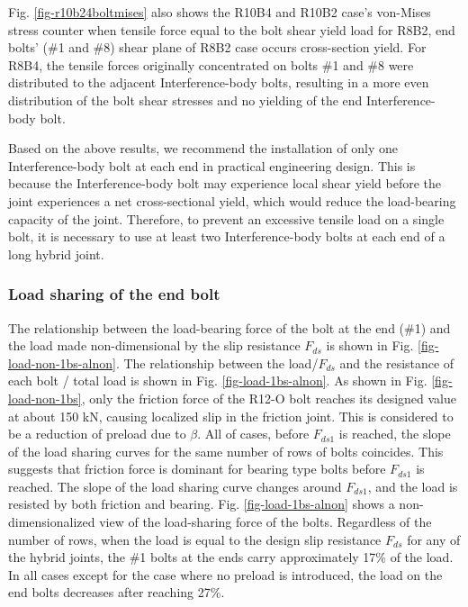 Fig. \ref{fig-r10b24boltmises} also shows the R10B4 and R10B2 case's von-Mises stress counter when tensile force equal to the bolt shear yield load for R8B2, end bolts' (\#1 and \#8) shear plane of R8B2 case occurs cross-section yield. For R8B4, the tensile forces originally concentrated on bolts \#1 and \#8 were distributed to the adjacent Interference-body bolts, resulting in a more even distribution of the bolt shear stresses and no yielding of the end Interference-body bolt.

Based on the above results, we recommend the installation of only one Interference-body bolt at each end in practical engineering design. This is because the Interference-body bolt may experience local shear yield before the joint experiences a net cross-sectional yield, which would reduce the load-bearing capacity of the joint. Therefore, to prevent an excessive tensile load on a single bolt, it is necessary to use at least two Interference-body bolts at each end of a long hybrid joint.


\subsubsection{Load sharing of the end bolt}

The relationship between the load-bearing force of the bolt at the end (\#1) and the load made non-dimensional by the slip resistance $F_{ds}$ is shown in Fig. \ref{fig-load-non-1bs-alnon}. The relationship between the load/$F_{ds}$ and the resistance of each bolt / total load is shown in Fig. \ref{fig-load-1bs-alnon}. As shown in Fig. \ref{fig-load-non-1bs}, only the friction force of the R12-O bolt reaches its designed value at about 150 kN, causing localized slip in the friction joint. This is considered to be a reduction of preload due to $\beta$. All of cases, before $F_{ds1}$ is reached, the slope of the load sharing curves for the same number of rows of bolts coincides. This suggests that friction force is dominant for bearing type bolts before $F_{ds1}$ is reached. The slope of the load sharing curve changes around $F_{ds1}$, and the load is resisted by both friction and bearing. Fig. \ref{fig-load-1bs-alnon} shows a non-dimensionalized view of the load-sharing force of the bolts. Regardless of the number of rows, when the load is equal to the design slip resistance $F_{ds}$ for any of the hybrid joints, the \#1 bolts at the ends carry approximately 17\% of the load. In all cases except for the case where no preload is introduced, the load on the end bolts decreases after reaching 27\%.

